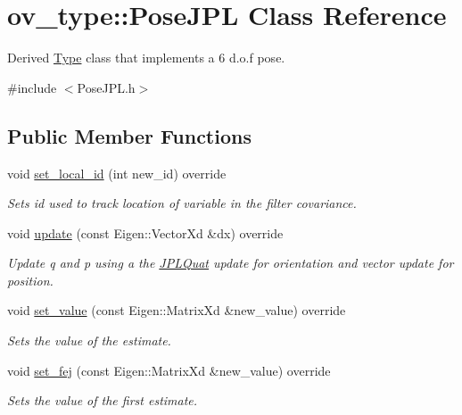 \hypertarget{classov__type_1_1PoseJPL}{}\section{ov\+\_\+type\+:\+:Pose\+J\+PL Class Reference}
\label{classov__type_1_1PoseJPL}


Derived \hyperlink{classov__type_1_1Type}{Type} class that implements a 6 d.\+o.\+f pose.  




{\ttfamily \#include $<$Pose\+J\+P\+L.\+h$>$}

\subsection*{Public Member Functions}
\begin{DoxyCompactItemize}
\item 
void \hyperlink{classov__type_1_1PoseJPL_a2295d3fbdd9529c1464957961a886731}{set\+\_\+local\+\_\+id} (int new\+\_\+id) override
\begin{DoxyCompactList}\small\item\em Sets id used to track location of variable in the filter covariance. \end{DoxyCompactList}\item 
void \hyperlink{classov__type_1_1PoseJPL_a8c961e8638cdc37a2b37c1fa50fc67a2}{update} (const Eigen\+::\+Vector\+Xd \&dx) override
\begin{DoxyCompactList}\small\item\em Update q and p using a the \hyperlink{classov__type_1_1JPLQuat}{J\+P\+L\+Quat} update for orientation and vector update for position. \end{DoxyCompactList}\item 
void \hyperlink{classov__type_1_1PoseJPL_a203f719544e8f3e11eb74b1b1458e3d6}{set\+\_\+value} (const Eigen\+::\+Matrix\+Xd \&new\+\_\+value) override
\begin{DoxyCompactList}\small\item\em Sets the value of the estimate. \end{DoxyCompactList}\item 
void \hyperlink{classov__type_1_1PoseJPL_aa20a30cf44fefdb749565c0e60fe027a}{set\+\_\+fej} (const Eigen\+::\+Matrix\+Xd \&new\+\_\+value) override
\begin{DoxyCompactList}\small\item\em Sets the value of the first estimate. \end{DoxyCompactList}\item 

\end{DoxyCompactItemize}
